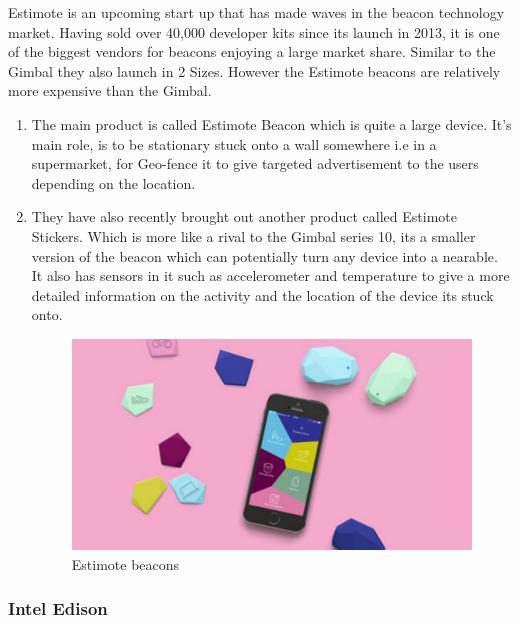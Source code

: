 Estimote\cite{estimote} is an upcoming start up that has made waves
in the beacon technology market. Having sold over 40,000 developer
kits since its launch in 2013, it is one of the biggest vendors for
beacons enjoying a large market share. Similar to the Gimbal they
also launch in 2 Sizes. However the Estimote beacons are relatively
more expensive than the Gimbal.
\begin{enumerate}
\item The main product is called Estimote Beacon which is quite a large
device. It's main role, is to be stationary stuck onto a wall somewhere
i.e in a supermarket, for Geo-fence it to give targeted advertisement
to the users depending on the location.  
\item They have also recently brought out another product called Estimote
Stickers. Which is more like a rival to the Gimbal series 10, its
a smaller version of the beacon which can potentially turn any device
into a nearable. It also has sensors in it such as accelerometer and
temperature to give a more detailed information on the activity and
the location of the device its stuck onto.
\begin{figure}[H]
\includegraphics[scale=0.3]{images/estimote}

\protect\caption{Estimote beacons}


\end{figure}

\end{enumerate}

\subsubsection{Intel Edison}

